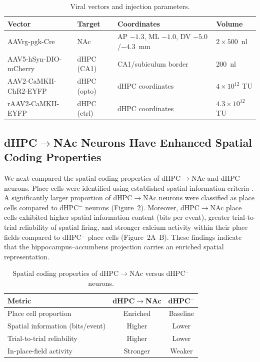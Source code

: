 \documentclass[11pt]{article}
\begin{document}
\begin{table}[H]
\centering
\caption{Viral vectors and injection parameters.}
\label{tab:viral}
\begin{tabular}{llll}
\toprule
Vector & Target & Coordinates & Volume \\
\midrule
AAVrg-pgk-Cre & NAc & AP $-1.3$, ML $-1.0$, DV $-5.0$/$-4.3$~mm & $2 \times 500$~nl \\
AAV5-hSyn-DIO-mCherry & dHPC (CA1) & CA1/subiculum border & 200~nl \\
AAV2-CaMKII-ChR2-EYFP & dHPC (opto) & dHPC coordinates & $4 \times 10^{12}$ TU \\
rAAV2-CaMKII-EYFP & dHPC (ctrl) & dHPC coordinates & $4.3 \times 10^{12}$ TU \\
\bottomrule
\end{tabular}
\end{table}

\subsection{dHPC$\to$NAc Neurons Have Enhanced Spatial Coding Properties}

We next compared the spatial coding properties of dHPC$\to$NAc and dHPC$^-$ neurons. Place cells were identified using established spatial information criteria \citep{Skaggs1993,Markus1994}. A significantly larger proportion of dHPC$\to$NAc neurons were classified as place cells compared to dHPC$^-$ neurons (Figure~2). Moreover, dHPC$\to$NAc place cells exhibited higher spatial information content (bits per event), greater trial-to-trial reliability of spatial firing, and stronger calcium activity within their place fields compared to dHPC$^-$ place cells (Figure~2A--B). These findings indicate that the hippocampus--accumbens projection carries an enriched spatial representation.

\begin{table}[H]
\centering
\caption{Spatial coding properties of dHPC$\to$NAc versus dHPC$^-$ neurons.}
\label{tab:spatial}
\begin{tabular}{lcc}
\toprule
Metric & dHPC$\to$NAc & dHPC$^-$ \\
\midrule
Place cell proportion & Enriched & Baseline \\
Spatial information (bits/event) & Higher & Lower \\
Trial-to-trial reliability & Higher & Lower \\
In-place-field activity & Stronger & Weaker \\
\bottomrule
\end{tabular}
\end{table}
\end{document}
